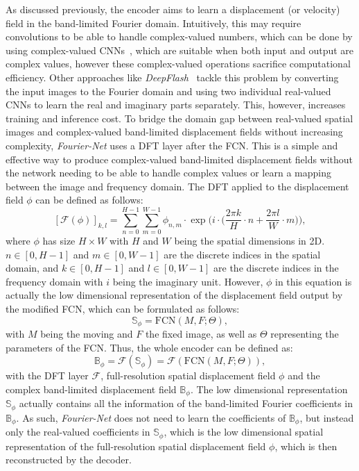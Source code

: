 As discussed previously, the encoder aims to learn a displacement (or velocity) field in the band-limited Fourier domain. Intuitively, this may require convolutions to be able to handle complex-valued numbers, which can be done by using complex-valued CNNs~\cite{Trabelsi2017}, which are suitable when both input and output are complex values, however these complex-valued operations sacrifice computational efficiency. Other approaches like \emph{DeepFlash}~\cite{DeepFlash} tackle this problem by converting the input images to the Fourier domain and using two individual real-valued CNNs to learn the real and imaginary parts separately. This, however, increases training and inference cost. To bridge the domain gap between real-valued spatial images and complex-valued band-limited displacement fields without increasing complexity, \emph{Fourier-Net} uses a DFT layer after the FCN. This is a simple and effective way to produce complex-valued band-limited displacement fields without the network needing to be able to handle complex values or learn a mapping between the image and frequency domain. The DFT applied to the displacement field $\phi$ can be defined as follows:
\begin{equation} \label{eq:DFT}
	[\mathcal{F}(\phi)]_{k,l} = \sum^{H-1}_{n=0} \sum^{W-1}_{m=0} \phi_{n,m} \cdot \exp \Bigg(i \cdot \bigg(\frac{2 \pi k}{H} \cdot n + \frac{2 \pi l}{W} \cdot m \bigg) \Bigg),
\end{equation}
where $\phi$ has size $H \times W$ with $H$ and $W$ being the spatial dimensions in 2D. $n \in [0,H-1]$ and $m \in [0,W-1]$ are the discrete indices in the spatial domain, and $k \in [0,H-1]$ and $l \in [0,W-1]$ are the discrete indices in the frequency domain with $i$ being the imaginary unit. However, $\phi$ in this equation is actually the low dimensional representation of the displacement field output by the modified FCN, which can be formulated as follows:
\begin{equation} \label{eq:FCN}
	\mathbb{S}_\phi = \text{FCN}(M,F;\Theta),
\end{equation}
with $M$ being the moving and $F$ the fixed image, as well as $\Theta$ representing the parameters of the FCN. Thus, the whole encoder can be defined as:
\begin{equation}\label{eq:encoder}
	\mathbb{B}_\phi = \mathcal{F}(\mathbb{S}_\phi) = \mathcal{F}(\text{FCN}(M,F;\Theta)),
\end{equation}
with the DFT layer $\mathcal{F}$, full-resolution spatial displacement field $\phi$ and the complex band-limited displacement field $\mathbb{B}_\phi$. The low dimensional representation $\mathbb{S}_\phi$ actually contains all the information of the band-limited Fourier coefficients in $\mathbb{B}_\phi$. As such, \emph{Fourier-Net} does not need to learn the coefficients of $\mathbb{B}_\phi$, but instead only the real-valued coefficients in $\mathbb{S}_\phi$, which is the low dimensional spatial representation of the full-resolution spatial displacement field $\phi$, which is then reconstructed by the decoder. 

